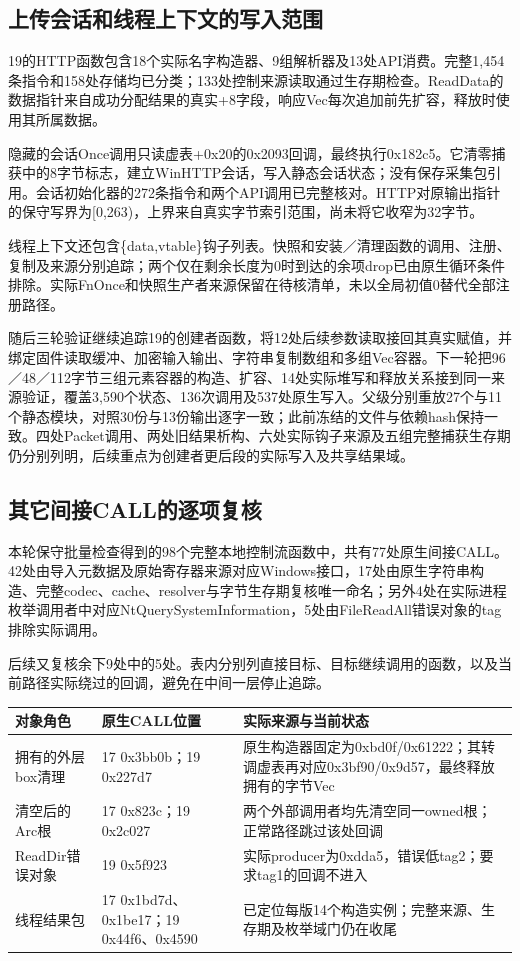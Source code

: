 \documentclass[UTF8,a4paper,zihao=5,fontset=windows]{ctexart}
\newcommand{\code}[1]{{\ttfamily\small #1}}
\begin{document}
\subsection{上传会话和线程上下文的写入范围}
19的HTTP函数包含18个实际名字构造器、9组解析器及13处API消费。完整1,454条指令和158处存储均已分类；133处控制来源读取通过生存期检查。\code{ReadData}的数据指针来自成功分配结果的真实\code{+8}字段，响应Vec每次追加前先扩容，释放时使用其所属数据。

隐藏的会话Once调用只读虚表\code{+0x20}的\code{0x2093}回调，最终执行\code{0x182c5}。它清零捕获中的8字节标志，建立WinHTTP会话，写入静态会话状态；没有保存采集包引用。会话初始化器的272条指令和两个API调用已完整核对。HTTP对原输出指针的保守写界为\code{[0,263)}，上界来自真实字节索引范围，尚未将它收窄为32字节。

线程上下文还包含\code{\{data,vtable\}}钩子列表。快照和安装／清理函数的调用、注册、复制及来源分别追踪；两个仅在剩余长度为0时到达的余项drop已由原生循环条件排除。实际FnOnce和快照生产者来源保留在待核清单，未以全局初值0替代全部注册路径。

随后三轮验证继续追踪19的创建者函数，将12处后续参数读取接回其真实赋值，并绑定固件读取缓冲、加密输入输出、字符串复制数组和多组Vec容器。下一轮把96／48／112字节三组元素容器的构造、扩容、14处实际堆写和释放关系接到同一来源验证，覆盖3,590个状态、136次调用及537处原生写入。父级分别重放27个与11个静态模块，对照30份与13份输出逐字一致；此前冻结的文件与依赖hash保持一致。四处Packet调用、两处旧结果析构、六处实际钩子来源及五组完整捕获生存期仍分别列明，后续重点为创建者更后段的实际写入及共享结果域。

\subsection{其它间接CALL的逐项复核}
本轮保守批量检查得到的98个完整本地控制流函数中，共有77处原生间接CALL。42处由导入元数据及原始寄存器来源对应Windows接口，17处由原生字符串构造、完整codec、cache、resolver与字节生存期复核唯一命名；另外4处在实际进程枚举调用者中对应NtQuerySystemInformation，5处由FileReadAll错误对象的tag排除实际调用。

后续又复核余下9处中的5处。表内分别列直接目标、目标继续调用的函数，以及当前路径实际绕过的回调，避免在中间一层停止追踪。
\begin{longtable}{@{}L{34mm}L{56mm}L{60mm}@{}}\toprule 对象角色 & 原生CALL位置 & 实际来源与当前状态\\\midrule\endhead
拥有的外层box清理 & 17 \code{0x3bb0b}；19 \code{0x227d7} & 原生构造器固定为\code{0xbd0f}/\code{0x61222}；其转调虚表再对应\code{0x3bf90}/\code{0x9d57}，最终释放拥有的字节Vec\\
清空后的Arc根 & 17 \code{0x823c}；19 \code{0x2c027} & 两个外部调用者均先清空同一owned根；正常路径跳过该处回调\\
ReadDir错误对象 & 19 \code{0x5f923} & 实际producer为\code{0xdda5}，错误低tag2；要求tag1的回调不进入\\
线程结果包 & 17 \code{0x1bd7d}、\code{0x1be17}；19 \code{0x44f6}、\code{0x4590} & 已定位每版14个构造实例；完整来源、生存期及枚举域门仍在收尾\\\bottomrule\end{longtable}
\end{document}
